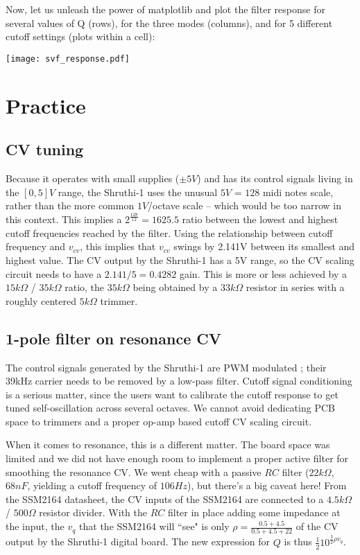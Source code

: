 \documentclass[a4paper,11pt]{article}
\begin{document}
Now, let us unleash the power of matplotlib and plot the filter response for several values of Q (rows), for the three modes (columns), and for 5 different cutoff settings (plots within a cell):

\begin{center}
\texttt{[image: svf\_response.pdf]}
\end{center}

\section{Practice}

\subsection{CV tuning}

Because it operates with small supplies ($\pm 5V$) and has its control signals living in the $[0, 5]V$ range, the Shruthi-1 uses the unusual $5V$ = $128$ midi notes scale, rather than the more common $1V$/octave scale -- which would be too narrow in this context. This implies a $2^{\frac{128}{12}} = 1625.5$ ratio between the lowest and highest cutoff frequencies reached by the filter. Using the relationship between cutoff frequency and $v_{cv}$, this implies that $v_{cv}$ swings by 2.141V between its smallest and highest value. The CV output by the Shruthi-1 has a 5V range, so the CV scaling circuit needs to have a $2.141 / 5 = 0.4282$ gain. This is more or less achieved by a $15k\Omega$ / $35k\Omega$ ratio, the $35k\Omega$ being obtained by a $33k\Omega$ resistor in series with a roughly centered $5k\Omega$ trimmer.

\subsection{1-pole filter on resonance CV}

The control signals generated by the Shruthi-1 are PWM modulated ; their 39kHz carrier needs to be removed by a low-pass filter. Cutoff signal conditioning is a serious matter, since the users want to calibrate the cutoff response to get tuned self-oscillation across several octaves. We cannot avoid dedicating PCB space to trimmers and a proper op-amp based cutoff CV scaling circuit.

When it comes to resonance, this is a different matter. The board space was limited and we did not have enough room to implement a proper active filter for smoothing the resonance CV. We went cheap with a passive $RC$ filter ($22k\Omega$, $68nF$, yielding a cutoff frequency of $106 Hz$), but there's a big caveat here! From the SSM2164 datasheet, the CV inputs of the SSM2164 are connected to a $4.5k\Omega$ / $500\Omega$ resistor divider. With the $RC$ filter in place adding some impedance at the input, the $v_{q}$ that the SSM2164 will ``see" is only $\rho = \frac{0.5 + 4.5}{0.5 + 4.5 + 22}$ of the CV output by the Shruthi-1 digital board. The new expression for $Q$ is thus $\frac{1}{2} 10^{\frac{3}{2} \rho v_{q}}$.
\end{document}
